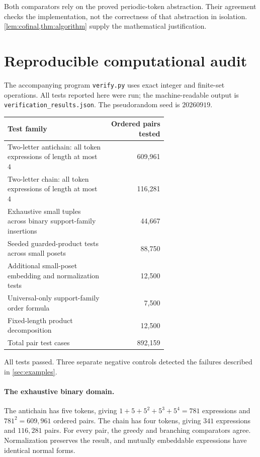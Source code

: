 \documentclass[11pt]{article}
\numberwithin{equation}{section}
\theoremstyle{plain}
\theoremstyle{definition}
\theoremstyle{remark}
\begin{document}
Both comparators rely on the proved periodic-token abstraction. Their agreement checks the implementation, not the correctness of that abstraction in isolation. \cref{lem:cofinal,thm:algorithm} supply the mathematical justification.

\section{Reproducible computational audit}\label{sec:verification}

The accompanying program \texttt{verify.py} uses exact integer and finite-set operations. All tests reported here were run; the machine-readable output is \texttt{verification\_results.json}. The pseudorandom seed is $20260919$.

\begin{center}
\begin{tabular}{@{}p{0.63\linewidth}r@{}}
\toprule
Test family & Ordered pairs tested\\
\midrule
Two-letter antichain: all token expressions of length at most $4$ & 609,961\\
Two-letter chain: all token expressions of length at most $4$ & 116,281\\
Exhaustive small tuples across binary support-family insertions & 44,667\\
Seeded guarded-product tests across small posets & 88,750\\
Additional small-poset embedding and normalization tests & 12,500\\
Universal-only support-family order formula & 7,500\\
Fixed-length product decomposition & 12,500\\
\midrule
Total pair test cases & 892,159\\
\bottomrule
\end{tabular}
\end{center}

All tests passed. Three separate negative controls detected the failures described in \cref{sec:examples}.

\paragraph{The exhaustive binary domain.}
The antichain has five tokens, giving $1+5+5^2+5^3+5^4=781$ expressions and $781^2=609{,}961$ ordered pairs. The chain has four tokens, giving $341$ expressions and $116{,}281$ pairs. For every pair, the greedy and branching comparators agree. Normalization preserves the result, and mutually embeddable expressions have identical normal forms.
\end{document}
